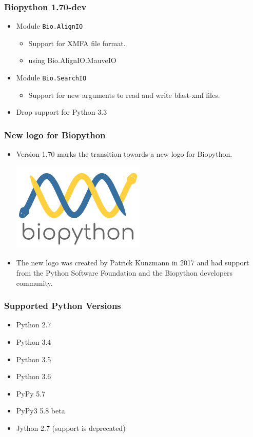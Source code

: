 \documentclass[trans]{beamer}
\begin{document}
\frame
{
  \frametitle{Biopython 1.70-dev}

  \begin{itemize}
  \item Module \texttt{Bio.AlignIO}
  \begin{itemize}
  \item Support for XMFA file format.
  \item using Bio.AlignIO.MauveIO
  \end{itemize}
  \end{itemize}
  \begin{itemize}
  \item Module \texttt{Bio.SearchIO}
  \begin{itemize}
  \item Support for new arguments to read and write blast-xml files.
  \end{itemize}
  \item Drop support for Python 3.3
  \end{itemize}

}
\frame
{
  \frametitle{New logo for Biopython}

  \begin{itemize}
  \item Version 1.70 marks the transition towards a new logo for Biopython.

  \begin{center}
  \includegraphics[width=0.5\textwidth]{figures/biopython_logo_s.png}
  \end{center}

  \item The new logo was created by Patrick Kunzmann in 2017 and had support from the Python Software Foundation and the Biopython developers community.
  \end{itemize}

}
\frame
{
  \frametitle{Supported Python Versions}

  \begin{itemize}
  \item Python 2.7
  \item Python 3.4
  \item Python 3.5
  \item Python 3.6
  \item PyPy 5.7
  \item PyPy3 5.8 beta
  \item Jython 2.7 (support is deprecated)
  \end{itemize}
}
\end{document}
